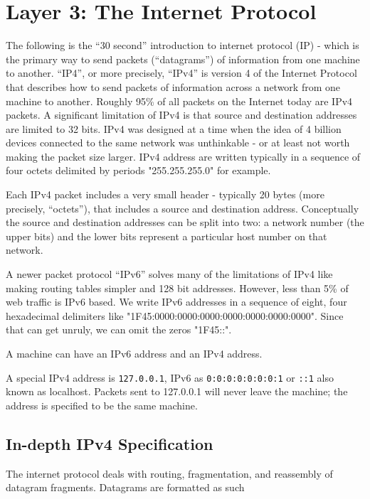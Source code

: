 \section{Layer 3: The Internet Protocol}

The following is the ``30 second'' introduction to internet protocol (IP) - which is the primary way to send packets (``datagrams'') of information from one machine to another. ``IP4'', or more precisely, ``IPv4'' is version 4 of the Internet Protocol that describes how to send packets of information across a network from one machine to another. Roughly 95\% of all packets on the Internet today are IPv4 packets. A significant limitation of IPv4 is that source and destination addresses are limited to 32 bits. IPv4 was designed at a time when the idea of 4 billion devices connected to the same network was unthinkable - or at least not worth making the packet size larger. IPv4 address are written typically in a sequence of four octets delimited by periods "255.255.255.0" for example.

Each IPv4 packet includes a very small header - typically 20 bytes (more precisely, ``octets''), that includes a source and destination address. Conceptually the source and destination addresses can be split into two: a network number (the upper bits) and the lower bits represent a particular host number on that network.

A newer packet protocol ``IPv6'' solves many of the limitations of IPv4 like making routing tables simpler and 128 bit addresses. However, less than 5\% of web traffic is IPv6 based. We write IPv6 addresses in a sequence of eight, four hexadecimal delimiters like "1F45:0000:0000:0000:0000:0000:0000:0000". Since that can get unruly, we can omit the zeros "1F45::".

A machine can have an IPv6 address and an IPv4 address.

A special IPv4 address is \texttt{127.0.0.1}, IPv6 as \texttt{0:0:0:0:0:0:0:1} or \texttt{::1} also known as localhost. Packets sent to 127.0.0.1 will never leave the machine; the address is specified to be the same machine.

\subsection{In-depth IPv4 Specification}

The internet protocol deals with routing, fragmentation, and reassembly of datagram fragments. Datagrams are formatted as such

